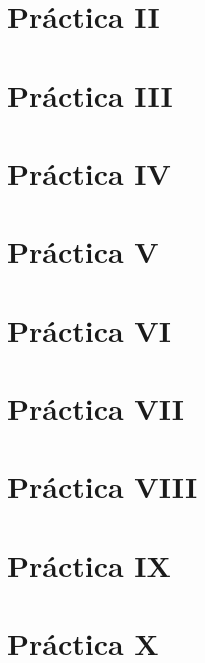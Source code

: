 \documentclass[11pt, a4paper]{article}
\theoremstyle{plain}
\theoremstyle{definition}
\begin{document}
\section{Práctica II}

\clearpage

\section{Práctica III}

\clearpage

\section{Práctica IV}

\clearpage

\section{Práctica V}

\clearpage

\section{Práctica VI}

\clearpage

\section{Práctica VII}

\clearpage

\section{Práctica VIII}

\clearpage

\section{Práctica IX}

\clearpage

\section{Práctica X}

\clearpage
\end{document}

